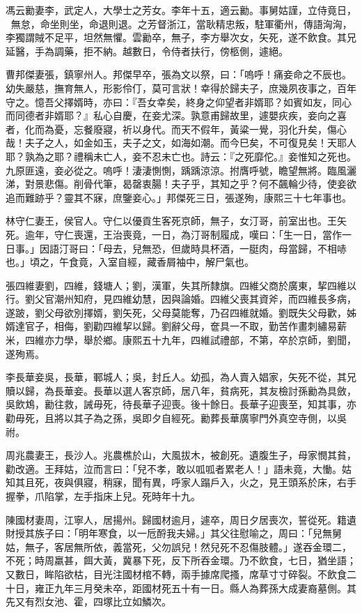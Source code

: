 \begin{pinyinscope}
馮云勷妻李，武定人，大學士之芳女。李年十五，適云勷。事舅姑謹，立侍竟日，無怠，命坐則坐，命退則退。之芳督浙江，當耿精忠叛，駐軍衢州，傳語洶洶，李獨謂賊不足平，坦然無懼。雲勷卒，無子，李方舉次女，矢死，遂不飲食。其兄延醫，手為調藥，拒不納。越數日，令侍者扶行，傍柩側，遽絕。

曹邦傑妻張，鎮寧州人。邦傑早卒，張為文以祭，曰：「嗚呼！痛妾命之不辰也。幼失嚴慈，撫育無人，形影伶仃，莫可言狀！幸得於歸夫子，庶幾夙夜事之，百年守之。憶吾父擇婿時，亦曰：『吾女幸矣，終身之仰望者非婿耶？如賓如友，同心而同德者非婿耶？』私心自慶，在妾尤深。孰意甫歸故里，遽嬰疢疾，妾向之喜者，化而為憂，忘餐廢寢，祈以身代。而天不假年，黃粱一覺，羽化升矣，傷心哉！夫子之人，如金如玉，夫子之文，如海如潮。而今巳矣，不可復見矣！天耶人耶？孰為之耶？禮稱未亡人，妾不忍未亡也。詩云：『之死靡佗。』妾惟知之死也。九原匪遠，妾必從之。嗚呼！淒淒惻惻，踽踽涼涼。拊膺呼號，瞻望無將。臨風灑涕，對景悲傷。削骨代筆，曷罄衷腸！夫子乎，其知之乎？何不飆輪少待，使妾欲追而難跡乎？靈其不寐，庶鑒妾心。」邦傑死三日，張遂殉，康熙三十七年事也。

林守仁妻王，侯官人。守仁以優貢生客死京師，無子，女汀哥，前室出也。王矢死。逾年，守仁喪還，王治喪竟，一日，為汀哥制履成，嘆曰：「生一日，當作一日事。」因語汀哥曰：「母去，兒無恐，但歲時具杯酒，一脡肉，母當歸，不相哧也。」頃之，午食竟，入室自經，藏香屑袖中，解尸氣也。

張四維妻劉，四維，錢塘人；劉，漢軍，失其所隸旗。四維父商於廣東，挈四維以行。劉父官潮州知府，見四維幼慧，因與論婚。四維父喪其資斧，而四維長多病，遂跛，劉父母欲別擇婿，劉矢死，父母莫能奪，乃召四維就婚。劉既失父母歡，姊婿達官子，相侮，劉勸四維挈以歸。劉辭父母，奩具一不取，勤苦作畫刺繡易薪米，四維亦力學，舉於鄉。康熙五十九年，四維試禮部，不第，卒於京師，劉聞，遂殉焉。

李長華妾吳，長華，鄆城人；吳，封丘人。幼孤，為人賣入娼家，矢死不從，其兄贖以歸，為長華妾。長華以選人客京師，居八年，貧病死，其友檢討孫勷為具斂，吳飲鴆，勷往救，誡毋死，待長華子迎喪。後十餘日。長華子迎喪至，知其事，亦勸毋死，且將以其子為之孫，吳即夕自經死。勷葬長華廣寧門外真空寺側，以吳祔。

周兆農妻王，長沙人。兆農樵於山，大風拔木，被創死。遺腹生子，母家憫其貧，勸改適。王拜姑，泣而言曰：「兒不孝，敢以呱呱者累老人！」語未竟，大慟。姑知其且死，夜與俱寢，稍寐，聞有異，呼家人蹋戶入，火之，見王頭系於床，右手握拳，爪陷掌，左手指床上兒。死時年十九。

陳國材妻周，江寧人，居揚州。歸國材逾月，遽卒，周日夕居喪次，誓從死。籍遺財授其族子曰：「明年寒食，以一卮酹我夫婦。」其父往慰喻之，周曰：「兒無舅姑，無子，客居無所依，義當死，父勿誤兒！然兒死不忍傷肢體。」遂吞金環二，不死；時周羸甚，餌大黃，冀暴下死，反下所吞金環。乃不飲食，七日，猶坐語；又數日，眸陷欲枯，目光注國材棺不轉，兩手據席爬搔，席草寸寸碎裂。不飲食二十日，雍正九年三月癸未卒，距國材死五十有一日。縣人為葬孫大成妻裔墓側。其先又有烈女池、霍，四塚比立如鱗次。


\end{pinyinscope}
